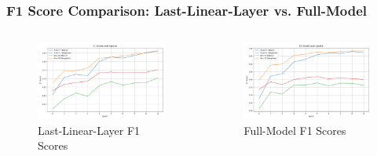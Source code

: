 \documentclass{beamer}
\begin{document}
\begin{frame}
  \frametitle{F1 Score Comparison: Last-Linear-Layer vs. Full-Model}
  \centering
  \begin{columns}
    \begin{figure}
      \includegraphics[width=\textwidth]{last-linear-layer/f1_metrics.png}
      \caption{Last-Linear-Layer F1 Scores}
    \end{figure}
    \begin{figure}
      \includegraphics[width=\textwidth]{full-model/f1_metrics.png}
      \caption{Full-Model F1 Scores}
    \end{figure}
  \end{columns}
\end{frame}
\end{document}
